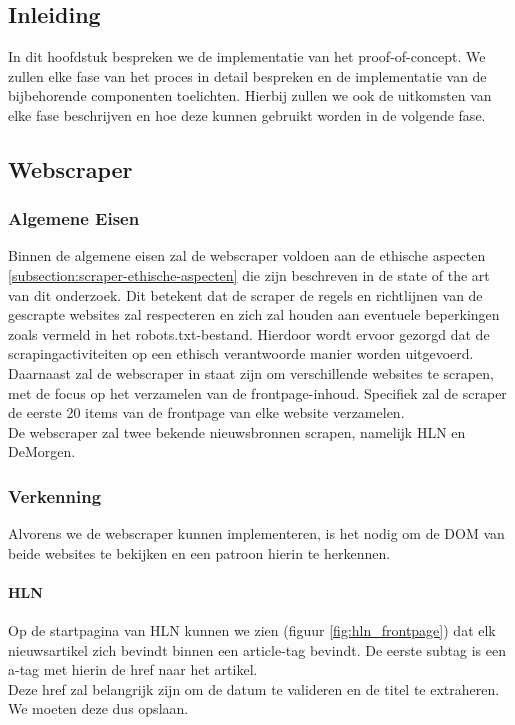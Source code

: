 \chapter{}%
\label{ch:proof-of-concept}
\section{Inleiding}
In dit hoofdstuk bespreken we de implementatie van het proof-of-concept. We zullen elke fase van het proces in detail bespreken en de implementatie van de bijbehorende componenten toelichten. Hierbij zullen we ook de uitkomsten van elke fase beschrijven en hoe deze kunnen gebruikt worden in de volgende fase. \\

\section{Webscraper}
\subsection{Algemene Eisen}
Binnen de algemene eisen zal de webscraper voldoen aan de ethische aspecten \ref{subsection:scraper-ethische-aspecten} die zijn beschreven in de state of the art van dit onderzoek. Dit betekent dat de scraper de regels en richtlijnen van de gescrapte websites zal respecteren en zich zal houden aan eventuele beperkingen zoals vermeld in het robots.txt-bestand. Hierdoor wordt ervoor gezorgd dat de scrapingactiviteiten op een ethisch verantwoorde manier worden uitgevoerd. \\

Daarnaast zal de webscraper in staat zijn om verschillende websites te scrapen, met de focus op het verzamelen van de frontpage-inhoud. Specifiek zal de scraper de eerste 20 items van de frontpage van elke website verzamelen. \\

De webscraper zal twee bekende nieuwsbronnen scrapen, namelijk HLN en DeMorgen.

\subsection{Verkenning}
Alvorens we de webscraper kunnen implementeren, is het nodig om de DOM van beide websites te bekijken en een patroon hierin te herkennen. \\
\subsubsection{HLN}
Op de startpagina van HLN kunnen we zien (figuur \ref{fig:hln_frontpage}) dat elk nieuwsartikel zich bevindt binnen een article-tag bevindt. De eerste subtag is een a-tag met hierin de href naar het artikel. \\ Deze href zal belangrijk zijn om de datum te valideren en de titel te extraheren. We moeten deze dus opslaan. 

